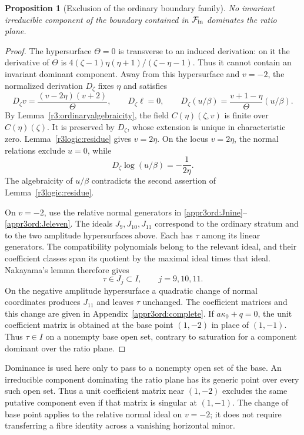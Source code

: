 \documentclass[11pt,a4paper]{article}
\numberwithin{equation}{section}
\theoremstyle{plain}
\newtheorem{proposition}[theorem]{Proposition}
\theoremstyle{definition}
\theoremstyle{remark}
\begin{document}
\begin{proposition}[Exclusion of the ordinary boundary family]
\label{r3:ordinaryexclusion}
No invariant irreducible component of the boundary contained
in $\mathcal F_{\rm in}$ dominates the ratio plane.
\end{proposition}
\begin{proof}
The hypersurface $\Theta=0$ is transverse to an induced derivation:
on it the derivative of $\Theta$ is
$4(\zeta-1)\eta(\eta+1)/(\zeta-\eta-1)$.
Thus it cannot contain an invariant dominant component.
Away from this hypersurface and $v=-2$, the normalized derivation
$D_\zeta$ fixes $\eta$ and satisfies
\begin{equation}\label{r3:ordinary-boundary-equations}
 D_\zeta v=\frac{(v-2\eta)(v+2)}{\Theta},\qquad
 D_\zeta\ell=0,\qquad
 D_\zeta(u/\beta)=\frac{v+1-\eta}{\Theta}(u/\beta).
\end{equation}
By Lemma~\ref{r3:ordinaryalgebraicity}, the field
$C(\eta)(\zeta,v)$ is finite over $C(\eta)(\zeta)$.
It is preserved by $D_\zeta$, whose extension is unique in
characteristic zero. Lemma~\ref{r3logic:residue} gives $v=2\eta$.
On the locus $v=2\eta$, the normal relations exclude $u=0$, while
\begin{equation}\label{r3:logarithmic-obstruction}
 D_\zeta\log(u/\beta)=-\frac1{2\eta}.
\end{equation}
The algebraicity of $u/\beta$ contradicts the second assertion of
Lemma~\ref{r3logic:residue}.

On $v=-2$, use the relative normal generators in
\eqref{appr3ord:Jnine}--\eqref{appr3ord:Jeleven}. The ideals
$J_9,J_{10},J_{11}$ correspond to the ordinary stratum and to the
two amplitude hypersurfaces above. Each has $\tau$ among its linear
generators. The compatibility polynomials belong to the relevant
ideal, and their coefficient classes span its quotient by the
maximal ideal times that ideal. Nakayama's lemma therefore gives
\[
 \tau\in J_j\subset I,\qquad j=9,10,11.
\]
On the negative amplitude hypersurface a quadratic change of normal
coordinates produces $J_{11}$ and leaves $\tau$ unchanged. The
coefficient matrices and this change are given in
Appendix~\ref{appr3ord:complete}. If $a\kappa_0+q=0$, the unit
coefficient matrix is obtained at the base point $(1,-2)$ in place
of $(1,-1)$. Thus $\tau\in I$ on a nonempty base open set, contrary
to saturation for a component dominant over the ratio plane.
\end{proof}

Dominance is used here only to pass to a nonempty open set of
the base. An irreducible component dominating the ratio plane
has its generic point over every such open set. Thus a unit
coefficient matrix near $(1,-2)$ excludes the same putative
component even if that matrix is singular at $(1,-1)$.
The change of base point applies to the relative normal ideal
on $v=-2$; it does not require transferring a fibre identity
across a vanishing horizontal minor.
\end{document}

